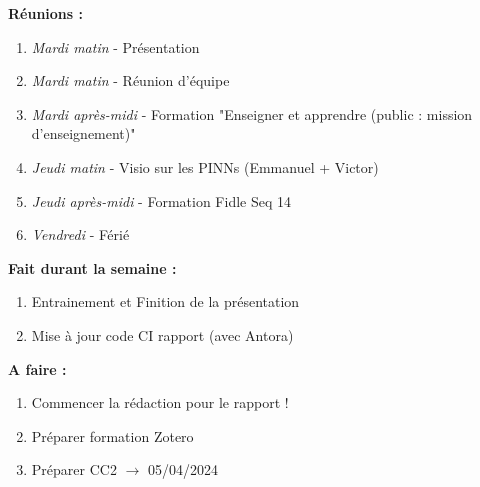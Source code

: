 \textbf{Réunions :}
\begin{enumerate}[label=\textbullet]
	\item \textit{Mardi matin} - Présentation
	\item \textit{Mardi matin} - Réunion d'équipe
	\item \textit{Mardi après-midi} - Formation "Enseigner et apprendre (public : mission d'enseignement)"
	\item \textit{Jeudi matin} - Visio sur les PINNs (Emmanuel + Victor)
	\item \textit{Jeudi après-midi} - Formation Fidle Seq 14
	\item \textit{Vendredi} - Férié
\end{enumerate}
\textbf{Fait durant la semaine :}
\begin{enumerate}[label=\textbullet]
	\item Entrainement et Finition de la présentation
	\item Mise à jour code CI rapport (avec Antora)
\end{enumerate}
\textbf{A faire :}
\begin{enumerate}[label=\textbullet]
	\item Commencer la rédaction pour le rapport !
	\item Préparer formation Zotero
	\item Préparer CC2 $\rightarrow$ 05/04/2024
\end{enumerate}